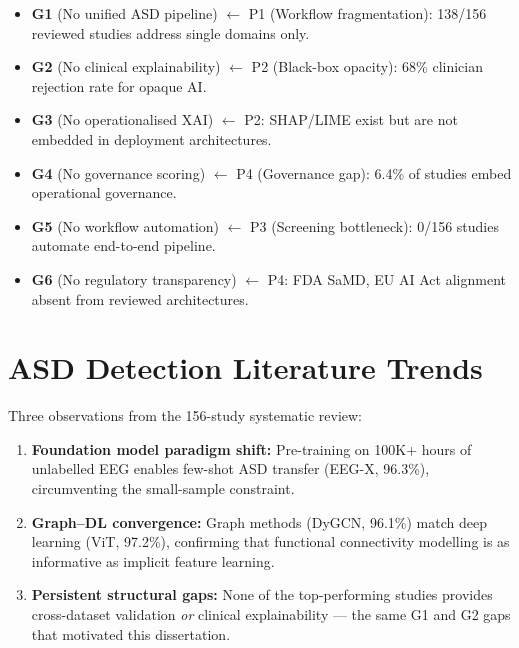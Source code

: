 \begin{itemize}[leftmargin=*, itemsep=3pt]
\item \textbf{G1} (No unified ASD pipeline) $\leftarrow$ P1 (Workflow fragmentation): 138/156 reviewed studies address single domains only.
\item \textbf{G2} (No clinical explainability) $\leftarrow$ P2 (Black-box opacity): 68\% clinician rejection rate for opaque AI.
\item \textbf{G3} (No operationalised XAI) $\leftarrow$ P2: SHAP/LIME exist but are not embedded in deployment architectures.
\item \textbf{G4} (No governance scoring) $\leftarrow$ P4 (Governance gap): 6.4\% of studies embed operational governance.
\item \textbf{G5} (No workflow automation) $\leftarrow$ P3 (Screening bottleneck): 0/156 studies automate end-to-end pipeline.
\item \textbf{G6} (No regulatory transparency) $\leftarrow$ P4: FDA SaMD, EU AI Act alignment absent from reviewed architectures.
\end{itemize}

\section{ASD Detection Literature Trends}

Three observations from the 156-study systematic review:
\begin{enumerate}[leftmargin=*, itemsep=3pt]
\item \textbf{Foundation model paradigm shift:} Pre-training on 100K+ hours of unlabelled EEG enables few-shot ASD transfer (EEG-X, 96.3\%), circumventing the small-sample constraint.
\item \textbf{Graph--DL convergence:} Graph methods (DyGCN, 96.1\%) match deep learning (ViT, 97.2\%), confirming that functional connectivity modelling is as informative as implicit feature learning.
\item \textbf{Persistent structural gaps:} None of the top-performing studies provides cross-dataset validation \textit{or} clinical explainability --- the same G1 and G2 gaps that motivated this dissertation.
\end{enumerate}

